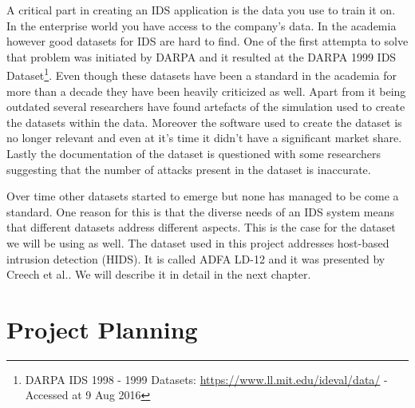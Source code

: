 \documentclass[reqno,openany,12pt]{amsbook}
\begin{document}
A critical part in creating an IDS application is the data you use to train it on. In the enterprise world you have access to the company's data. In the academia however good datasets for IDS are hard to find. One of the first attempta to solve that problem was initiated by DARPA and it resulted at the DARPA 1999 IDS Dataset\footnote{DARPA IDS 1998 - 1999 Datasets: \url{https://www.ll.mit.edu/ideval/data/} - Accessed at 9 Aug 2016}. Even though these datasets have been a standard in the academia for more than a decade they have been heavily criticized as well. Apart from it being outdated several researchers have found artefacts of the simulation used to create the datasets within the data. Moreover the software used to create the dataset is no longer relevant and even at it's time it didn't have a significant market share. Lastly the documentation of the dataset is questioned with some researchers suggesting
that the number of attacks present in the dataset is inaccurate.

Over time other datasets started to emerge but none has managed to be come a standard. One reason for this is that the diverse needs of an IDS system means that different datasets address different aspects. This is the case for the dataset we will be using as well. The dataset used in this project addresses host-based intrusion detection (HIDS). It is called ADFA LD-12 and it was presented by Creech et al.\cite{dat2}. We will describe it in detail in the next chapter.

\section{Project Planning}
\end{document}
